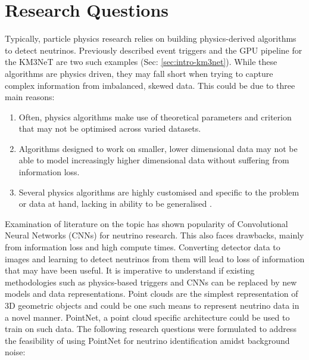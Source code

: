 \section{Research Questions}
\label{sec:intro-research-questions}
Typically, particle physics research relies on building physics-derived algorithms to detect neutrinos. Previously described event triggers and the GPU pipeline for the KM3NeT are two such examples (Sec: \ref{sec:intro-km3net}). While these algorithms are physics driven, they may fall short when trying to capture complex information from imbalanced, skewed data. This could be due to three main reasons:
\begin{enumerate}
    \item Often, physics algorithms make use of theoretical parameters and criterion that may not be optimised across varied datasets.
    \item Algorithms designed to work on smaller, lower dimensional data may not be able to model increasingly higher dimensional data without suffering from information loss.
    \item Several physics algorithms are highly customised and specific to the problem or data at hand, lacking in ability to be generalised \cite{denby1999neural}. 
\end{enumerate}

Examination of literature on the topic has shown popularity of Convolutional Neural Networks (CNNs) for neutrino research. This also faces drawbacks, mainly from information loss and high compute times. Converting detector data to images and learning to detect neutrinos from them will lead to loss of information that may have been useful. It is imperative to understand if existing methodologies such as physics-based triggers and CNNs can be replaced by new models and data representations. 
Point clouds are the simplest representation of 3D geometric objects and could be one such means to represent neutrino data in a novel manner. PointNet, a point cloud specific architecture could be used to train on such data. The following research questions were formulated to address the feasibility of using PointNet for neutrino identification amidst background noise:

